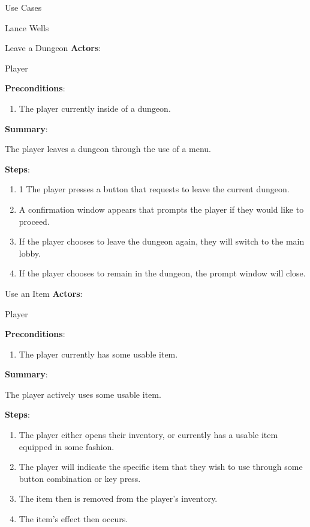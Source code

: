 \documentclass[12pt]{report}
\begin{document}
\begin{section}{Use Cases}
\begin{subsection}{Lance Wells}
\begin{subsubsection}{Leave a Dungeon}
\textbf{Actors}:

Player

\textbf{Preconditions}:

\begin{enumerate}
\item The player currently inside of a dungeon.
\end{enumerate}

\textbf{Summary}:

The player leaves a dungeon through the use of a menu.

\textbf{Steps}:

\begin{enumerate}
\item1 The player presses a button that requests to leave the current
dungeon.
\item A confirmation window appears that prompts the player if they would
like to proceed.
\item If the player chooses to leave the dungeon again, they will switch
to the main lobby.
\item If the player chooses to remain in the dungeon, the prompt window will
close.
\end{enumerate}
\end{subsubsection}

\begin{subsubsection}{Use an Item}
\textbf{Actors}:

Player

\textbf{Preconditions}:

\begin{enumerate}
\item The player currently has some usable item.
\end{enumerate}

\textbf{Summary}:

The player actively uses some usable item.

\textbf{Steps}:

\begin{enumerate}
\item The player either opens their inventory, or currently has a usable
item equipped in some fashion.
\item The player will indicate the specific item that they wish to use
through some button combination or key press.
\item The item then is removed from the player's inventory.
\item The item's effect then occurs.
\end{enumerate}
\end{subsubsection}


\end{subsection}
\end{section}
\end{document}
